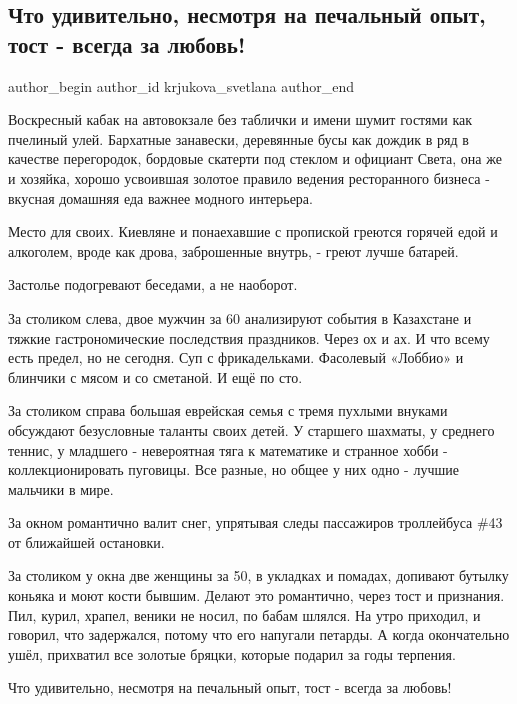  
 
 
 
 
 
\subsection{Что удивительно, несмотря на печальный опыт, тост - всегда за любовь!}
\label{sec:09_01_2022.fb.krjukova_svetlana.1.tost_vsegda_za_ljubov}
 
\ifcmt
 author_begin
   author_id krjukova_svetlana
 author_end
\fi

Воскресный кабак на автовокзале без таблички и имени шумит гостями как пчелиный
улей. Бархатные занавески, деревянные бусы как дождик в ряд в качестве
перегородок, бордовые скатерти под стеклом и официант Света, она же и хозяйка,
хорошо усвоившая золотое правило ведения ресторанного бизнеса - вкусная
домашняя еда важнее модного интерьера.

Место для своих. Киевляне и понаехавшие с пропиской греются горячей едой и
алкоголем, вроде как дрова, заброшенные внутрь, - греют лучше батарей. 

Застолье подогревают беседами, а не наоборот. 

За столиком слева, двое мужчин за 60 анализируют события в Казахстане и тяжкие
гастрономические последствия праздников. Через ох и ах. И что всему есть
предел, но не сегодня. Суп с фрикадельками. Фасолевый «Лоббио» и блинчики с
мясом и со сметаной. И ещё по сто. 

За столиком справа большая еврейская семья с тремя пухлыми внуками обсуждают
безусловные таланты своих детей. У старшего шахматы, у среднего теннис, у
младшего - невероятная тяга к математике и странное хобби - коллекционировать
пуговицы. Все разные, но общее у них одно - лучшие мальчики в мире. 

За окном романтично валит снег, упрятывая следы пассажиров троллейбуса \#43 от
ближайшей остановки. 

За столиком у окна две женщины за 50, в укладках и помадах, допивают бутылку
коньяка и моют кости бывшим. Делают это романтично, через тост и признания.
Пил, курил, храпел, веники не носил, по бабам шлялся. На утро приходил, и
говорил, что задержался, потому что его напугали петарды. А когда окончательно
ушёл, прихватил все золотые бряцки, которые подарил за годы терпения. 

Что удивительно, несмотря на печальный опыт, тост - всегда за любовь!

